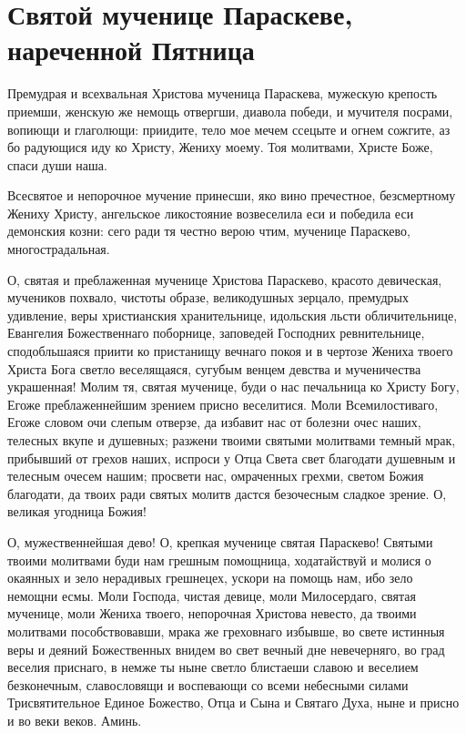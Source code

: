 \mychapterending





\section{Святой мученице Параскеве, нареченной Пятница}\begin{mymulticols}



Премудрая и всехвальная Христова мученица Параскева, мужескую крепость приемши, женскую же немощь отвергши, диавола победи, и мучителя посрами, вопиющи и глаголющи: приидите, тело мое мечем ссецыте и огнем сожгите, аз бо радующися иду ко Христу, Жениху моему. Тоя молитвами, Христе Боже, спаси души наша.




Всесвятое и непорочное мучение принесши, яко вино пречестное, безсмертному Жениху Христу, ангельское ликостояние возвеселила еси и победила еси демонския козни: сего ради тя честно верою чтим, мученице Параскево, многострадальная.




О, святая и преблаженная мученице Христова Параскево, красото девическая, мучеников похвало, чистоты образе, великодушных зерцало, премудрых удивление, веры христианския хранительнице, идольския льсти обличительнице, Евангелия Божественнаго поборнице, заповедей Господних ревнительнице, сподобльшаяся приити ко пристанищу вечнаго покоя и в чертозе Жениха твоего Христа Бога светло веселящаяся, сугубым венцем девства и мученичества украшенная! Молим тя, святая мученице, буди о нас печальница ко Христу Богу, Егоже преблаженнейшим зрением присно веселитися. Моли Всемилостиваго, Егоже словом очи слепым отверзе, да избавит нас от болезни очес наших, телесных вкупе и душевных; разжени твоими святыми молитвами темный мрак, прибывший от грехов наших, испроси у Отца Света свет благодати душевным и телесным очесем нашим; просвети нас, омраченных грехми, светом Божия благодати, да твоих ради святых молитв дастся безочесным сладкое зрение. О, великая угодница Божия!

О, мужественнейшая дево! О, крепкая мученице святая Параскево! Святыми твоими молитвами буди нам грешным помощница, ходатайствуй и молися о окаянных и зело нерадивых грешнецех, ускори на помощь нам, ибо зело немощни есмы. Моли Господа, чистая девице, моли Милосердаго, святая мученице, моли Жениха твоего, непорочная Христова невесто, да твоими молитвами пособствовавши, мрака же греховнаго избывше, во свете истинныя веры и деяний Божественных внидем во свет вечный дне невечерняго, во град веселия приснаго, в немже ты ныне светло блистаеши славою и веселием безконечным, славословящи и воспевающи со всеми небесными силами Трисвятительное Единое Божество, Отца и Сына и Святаго Духа, ныне и присно и во веки веков. Аминь.


\end{mymulticols}
